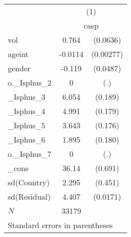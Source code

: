 \begin{tabular}{l*{1}{cc}} \hline\hline
             &\multicolumn{2}{c}{(1)}  \\
             &\multicolumn{2}{c}{casp} \\
\hline
vol          &       0.764&    (0.0636)\\
ageint       &     -0.0114&   (0.00277)\\
gender       &      -0.119&    (0.0487)\\
o.\_Isphus\_2  &           0&         (.)\\
\_Isphus\_3    &       6.054&     (0.189)\\
\_Isphus\_4    &       4.991&     (0.179)\\
\_Isphus\_5    &       3.643&     (0.176)\\
\_Isphus\_6    &       1.895&     (0.180)\\
o.\_Isphus\_7  &           0&         (.)\\
\_cons       &       36.14&     (0.691)\\
sd(Country)  &       2.295&     (0.451)\\
sd(Residual) &       4.407&    (0.0171)\\
\hline
\(N\)        &       33179&            \\
\hline\hline
\multicolumn{3}{l}{\footnotesize Standard errors in parentheses}\\
\end{tabular}

